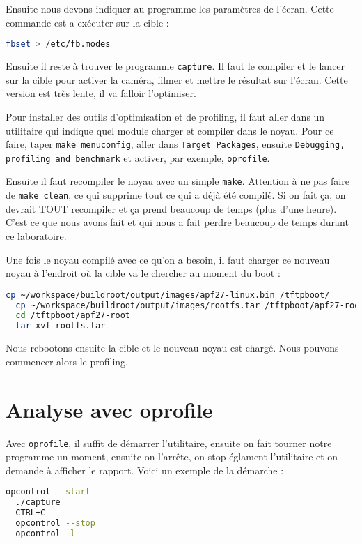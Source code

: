 Ensuite nous devons indiquer au programme les paramètres de l'écran. Cette commande est a exécuter sur la cible :

\begin{lstlisting}[language=bash]
  fbset > /etc/fb.modes
\end{lstlisting}

Ensuite il reste à trouver le programme \texttt{capture}. Il faut le compiler et le lancer sur la cible pour activer la caméra, filmer et mettre le résultat sur l'écran. Cette version est très lente, il va falloir l'optimiser.

Pour installer des outils d'optimisation et de profiling, il faut aller dans un utilitaire qui indique quel module charger et compiler dans le noyau.
Pour ce faire, taper \texttt{make menuconfig}, aller dans \texttt{Target Packages}, ensuite \texttt{Debugging, profiling and benchmark} et activer, par exemple, \texttt{oprofile}.

Ensuite il faut recompiler le noyau avec un simple \texttt{make}. Attention à ne pas faire de \texttt{make clean}, ce qui supprime tout ce qui a déjà été compilé. Si on fait ça, on devrait TOUT recompiler et ça prend beaucoup de temps (plus d'une heure). C'est ce que nous avons fait et qui nous a fait perdre beaucoup de temps durant ce laboratoire.

Une fois le noyau compilé avec ce qu'on a besoin, il faut charger ce nouveau noyau à l'endroit où la cible va le chercher au moment du boot :

\begin{lstlisting}[language=bash]
  cp ~/workspace/buildroot/output/images/apf27-linux.bin /tftpboot/
  cp ~/workspace/buildroot/output/images/rootfs.tar /tftpboot/apf27-root
  cd /tftpboot/apf27-root
  tar xvf rootfs.tar
\end{lstlisting}

Nous rebootons ensuite la cible et le nouveau noyau est chargé. Nous pouvons commencer alors le profiling.

\section{Analyse avec oprofile}

Avec \texttt{oprofile}, il suffit de démarrer l'utilitaire, ensuite on fait tourner notre programme un moment, ensuite on l'arrête, on stop églament l'utilitaire et on demande à afficher le rapport. Voici un exemple de la démarche :


\begin{lstlisting}[language=bash]
  opcontrol --start
  ./capture
  CTRL+C
  opcontrol --stop
  opcontrol -l
\end{lstlisting}

